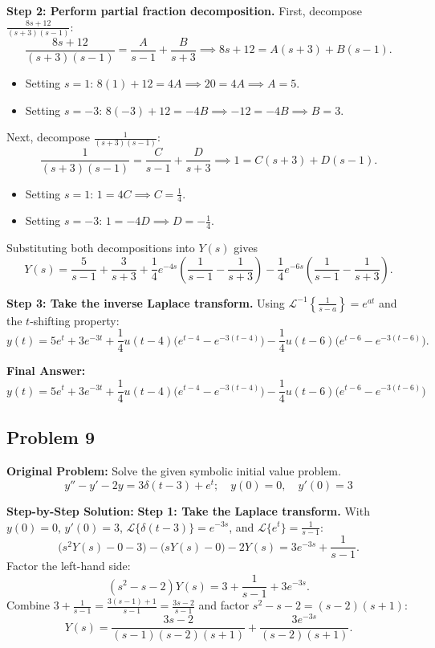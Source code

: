 \documentclass[11pt, letterpaper]{article}
\theoremstyle{definition}
\theoremstyle{remark}
\begin{document}
\textbf{Step 2: Perform partial fraction decomposition.}
First, decompose $\frac{8s + 12}{(s + 3)(s - 1)}$:
\[
    \frac{8s + 12}{(s + 3)(s - 1)} = \frac{A}{s - 1} + \frac{B}{s + 3} \implies 8s + 12 = A(s + 3) + B(s - 1).
\]
\begin{itemize}
    \item Setting $s = 1$: $8(1) + 12 = 4A \implies 20 = 4A \implies A = 5$.
    \item Setting $s = -3$: $8(-3) + 12 = -4B \implies -12 = -4B \implies B = 3$.
\end{itemize}
Next, decompose $\frac{1}{(s + 3)(s - 1)}$:
\[
    \frac{1}{(s + 3)(s - 1)} = \frac{C}{s - 1} + \frac{D}{s + 3} \implies 1 = C(s + 3) + D(s - 1).
\]
\begin{itemize}
    \item Setting $s = 1$: $1 = 4C \implies C = \frac{1}{4}$.
    \item Setting $s = -3$: $1 = -4D \implies D = -\frac{1}{4}$.
\end{itemize}
Substituting both decompositions into $Y(s)$ gives
\[
    Y(s) = \frac{5}{s - 1} + \frac{3}{s + 3} + \frac{1}{4}e^{-4s}\left(\frac{1}{s - 1} - \frac{1}{s + 3}\right) - \frac{1}{4}e^{-6s}\left(\frac{1}{s - 1} - \frac{1}{s + 3}\right).
\]

\textbf{Step 3: Take the inverse Laplace transform.}
Using $\mathcal{L}^{-1}\left\{\frac{1}{s - a}\right\} = e^{at}$ and the $t$-shifting property:
\[
    y(t) = 5e^{t} + 3e^{-3t} + \frac{1}{4}u(t - 4)\bigl(e^{t - 4} - e^{-3(t - 4)}\bigr) - \frac{1}{4}u(t - 6)\bigl(e^{t - 6} - e^{-3(t - 6)}\bigr).
\]

\textbf{Final Answer:}
\[
    y(t) = 5e^{t} + 3e^{-3t} + \frac{1}{4}u(t - 4)\bigl(e^{t - 4} - e^{-3(t - 4)}\bigr) - \frac{1}{4}u(t - 6)\bigl(e^{t - 6} - e^{-3(t - 6)}\bigr)
\]

\subsection{Problem 9}
\textbf{Original Problem:}
Solve the given symbolic initial value problem.
\[
    y'' - y' - 2y = 3\delta(t - 3) + e^{t}; \quad y(0) = 0,\quad y'(0) = 3
\]

\textbf{Step-by-Step Solution:}
\textbf{Step 1: Take the Laplace transform.}
With $y(0) = 0$, $y'(0) = 3$, $\mathcal{L}\{\delta(t - 3)\} = e^{-3s}$, and $\mathcal{L}\{e^{t}\} = \frac{1}{s - 1}$:
\[
    \bigl(s^2 Y(s) - 0 - 3\bigr) - \bigl(sY(s) - 0\bigr) - 2Y(s) = 3e^{-3s} + \frac{1}{s - 1}.
\]
Factor the left-hand side:
\[
    (s^2 - s - 2)Y(s) = 3 + \frac{1}{s - 1} + 3e^{-3s}.
\]
Combine $3 + \frac{1}{s - 1} = \frac{3(s - 1) + 1}{s - 1} = \frac{3s - 2}{s - 1}$ and factor $s^2 - s - 2 = (s - 2)(s + 1)$:
\[
    Y(s) = \frac{3s - 2}{(s - 1)(s - 2)(s + 1)} + \frac{3e^{-3s}}{(s - 2)(s + 1)}.
\]
\end{document}

